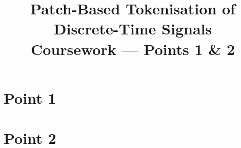\documentclass[12pt,a4paper]{article}
\title{\textbf{Patch-Based Tokenisation of Discrete-Time Signals}\\
	Coursework — Points 1 \& 2}
\date{}
\begin{document}
	 
	\maketitle
	\tableofcontents
	\newpage
	
	\setcounter{section}{0}
	\setcounter{page}{3}
	\section{Point 1} \label{sec:point1}
	
	\newpage
	\section{Point 2} \label{sec:point2}
	
	
	\newpage
	
	   
	
\end{document}
